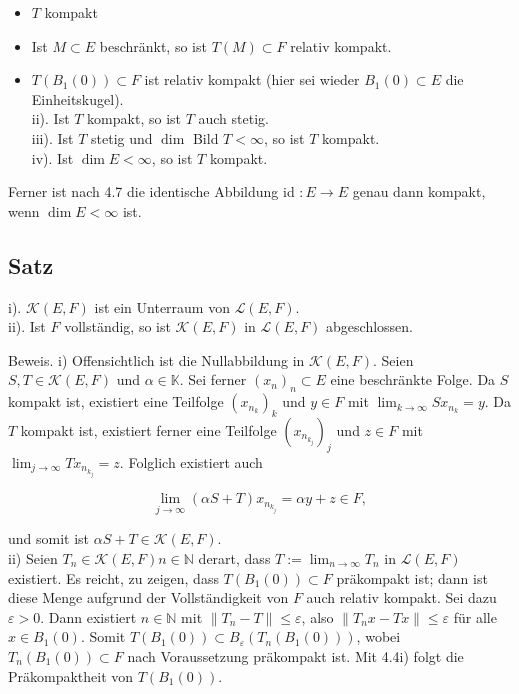 \documentclass[10pt, letterpaper]{article}
\begin{document}
\begin{itemize}
  \item $T$ kompakt
  \item Ist $M \subset E$ beschränkt, so ist $T(M) \subset F$ relativ kompakt.
  \item $T\left(B_{1}(0)\right) \subset F$ ist relativ kompakt (hier sei wieder $B_{1}(0) \subset E$ die Einheitskugel).\\
ii). Ist $T$ kompakt, so ist $T$ auch stetig.\\
iii). Ist $T$ stetig und $\operatorname{dim}$ Bild $T<\infty$, so ist $T$ kompakt.\\
iv). Ist $\operatorname{dim} E<\infty$, so ist $T$ kompakt.
\end{itemize}

Ferner ist nach 4.7 die identische Abbildung id $: E \rightarrow E$ genau dann kompakt, wenn $\operatorname{dim} E<\infty$ ist.

\subsection*{Satz}
i). $\mathcal{K}(E, F)$ ist ein Unterraum von $\mathcal{L}(E, F)$.\\
ii). Ist $F$ vollständig, so ist $\mathcal{K}(E, F)$ in $\mathcal{L}(E, F)$ abgeschlossen.

Beweis. i) Offensichtlich ist die Nullabbildung in $\mathcal{K}(E, F)$. Seien $S, T \in \mathcal{K}(E, F)$ und $\alpha \in \mathbb{K}$. Sei ferner $\left(x_{n}\right)_{n} \subset E$ eine beschränkte Folge. Da $S$ kompakt ist, existiert eine Teilfolge $\left(x_{n_{k}}\right)_{k}$ und $y \in F$ mit $\lim _{k \rightarrow \infty} S x_{n_{k}}=y$. Da $T$ kompakt ist, existiert ferner eine Teilfolge $\left(x_{n_{k_{j}}}\right)_{j}$ und $z \in F$ mit $\lim _{j \rightarrow \infty} T x_{n_{k_{j}}}=z$. Folglich existiert auch

$$
\lim _{j \rightarrow \infty}(\alpha S+T) x_{n_{k_{j}}}=\alpha y+z \in F,
$$

und somit ist $\alpha S+T \in \mathcal{K}(E, F)$.\\
ii) Seien $T_{n} \in \mathcal{K}(E, F) n \in \mathbb{N}$ derart, dass $T:=\lim _{n \rightarrow \infty} T_{n}$ in $\mathcal{L}(E, F)$ existiert. Es reicht, zu zeigen, dass $T\left(B_{1}(0)\right) \subset F$ präkompakt ist; dann ist diese Menge aufgrund der Vollständigkeit von $F$ auch relativ kompakt. Sei dazu $\varepsilon>0$. Dann existiert $n \in \mathbb{N}$ mit $\left\|T_{n}-T\right\| \leq \varepsilon$, also $\left\|T_{n} x-T x\right\| \leq \varepsilon$ für alle $x \in B_{1}(0)$. Somit $T\left(B_{1}(0)\right) \subset B_{\varepsilon}\left(T_{n}\left(B_{1}(0)\right)\right)$, wobei $T_{n}\left(B_{1}(0)\right) \subset F$ nach Voraussetzung präkompakt ist. Mit 4.4i) folgt die Präkompaktheit von $T\left(B_{1}(0)\right)$.
\end{document}
